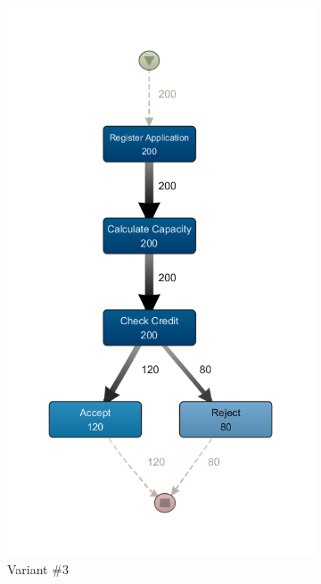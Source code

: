 \begin{figure}
\begin{subfigure}{.4\textwidth}
    \includegraphics[width=.8\linewidth]{5_results_discussions/loan-application-process/ETM_Configuration3}
    \caption{Variant \#3}
    \label{fig:loan-application-process-models-3}
  \end{subfigure}%
  \begin{subfigure}{.4\textwidth}
    \centering

\end{subfigure}
\end{figure}
